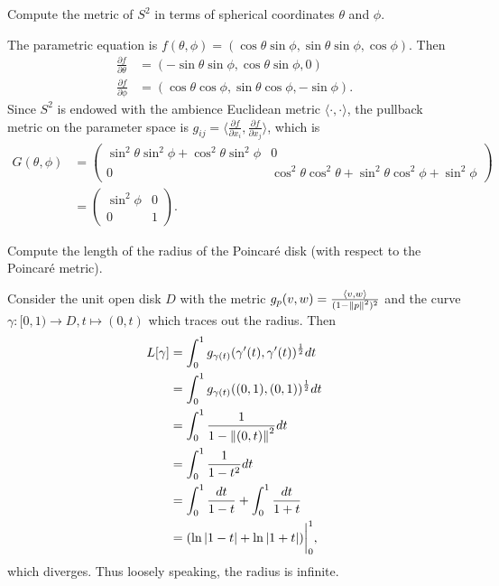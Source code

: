 \documentclass[12pt]{article}
\begin{document}
\begin{problem}[LN12 0.3.1]
Compute the metric of $ S^2$ in terms of spherical coordinates $ \theta$ and $ \phi$.
\end{problem}
The parametric equation is $ f(\theta,\phi) = (\cos \theta \sin \phi, \sin \theta \sin \phi, \cos \phi)$. Then
\begin{align*}
	\frac{\partial f}{\partial \theta} &= (-\sin \theta \sin \phi, \cos \theta \sin \phi, 0) \\
	\frac{\partial f}{\partial \phi} &= (\cos \theta \cos \phi, \sin \theta \cos \phi, -\sin \phi) . 
\end{align*}
Since $ S^2$ is endowed with the ambience Euclidean metric $ \langle \cdot , \cdot  \rangle$, the pullback metric on the parameter space is $ g_{ij} = \langle \frac{\partial f}{\partial x_i}, \frac{\partial f}{\partial x_j}  \rangle$, which is
\begin{align*}
	G(\theta,\phi) &= \begin{pmatrix} \sin^2 \theta \sin^2\phi + \cos^2\theta \sin^2\phi & 0\\ 0& \cos^2\theta\cos^2\theta+\sin^2\theta\cos^2\phi+\sin^2\phi \end{pmatrix} \\
	  &= \begin{pmatrix} \sin^2\phi&0\\0& 1 \end{pmatrix}   .
\end{align*}

\begin{problem}[LN12 0.4.1]
Compute the length of the radius of the Poincar\'e disk (with respect to the Poincar\'e metric).
\end{problem}
Consider the unit open disk $ D$ with the metric $ g_p(v,w) = \frac{\langle v,w \rangle}{ (1-{\left\lVert{ p}\right\rVert}^2 )^2}$ and the curve $ \gamma: [0,1) \to D, t\mapsto (0,t)$ which traces out the radius. Then
\begin{align*}
	L[ \gamma] &= \int_{ 0}^{ 1} g_{ \gamma(t)}( \gamma'(t), \gamma'(t))^{\frac{1}{2}} dt\\ 
	&= \int_{ 0}^{ 1} g_{ \gamma(t)}((0,1),(0,1))^{\frac{1}{2}} dt\\
	&= \int_{ 0}^{ 1} \frac{1}{ 1- {\left\lVert{ (0,t)}\right\rVert}^2 } dt \\
	&= \int_{ 0}^{ 1} \frac{1}{1-t^2 } dt \\
	&= \int_{ 0}^{ 1} \frac{dt}{1-t} + \int_{ 0}^{ 1} \frac{dt}{ 1+t}   \\
	&= (\ln |1-t| + \ln |1+t|)\bigg|_0^1 ,
\end{align*}
which diverges. Thus loosely speaking, the radius is infinite. 
\end{document}

